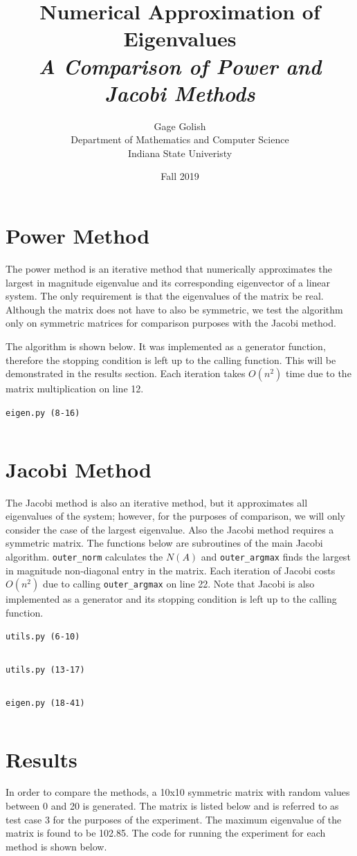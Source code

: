 \documentclass[12pt]{article}
\title{
  \textbf{Numerical Approximation of Eigenvalues}\\
  \Large \textit{A Comparison of Power and Jacobi Methods}
}
\author{
  Gage Golish\\
  Department of Mathematics and Computer Science\\
  Indiana State Univeristy
}
\date{Fall 2019}
\newcommand{\snippetfromfile}[3]{
  \begin{mdframed}[
      backgroundcolor=black!10,
      linewidth=0pt
  ]
    \begin{center}
      \dotfill\texttt{#1 (#2-#3)}\dotfill
      \inputminted[firstline=#2, lastline=#3, linenos]{python}{#1}
    \end{center}
  \end{mdframed}
}
\begin{document}
\maketitle
\thispagestyle{empty}

\pagebreak

\tableofcontents

\pagebreak

\section{Power Method}
The power method is an iterative method that numerically approximates the
largest in magnitude eigenvalue and its corresponding eigenvector of a linear
system. The only requirement is that the eigenvalues of the matrix be real.
Although the matrix does not have to also be symmetric, we test the algorithm
only on symmetric matrices for comparison purposes with the Jacobi method.

The algorithm is shown below. It was implemented as a generator function,
therefore the stopping condition is left up to the calling function. This will
be demonstrated in the results section. Each iteration takes $O(n^2)$ time due
to the matrix multiplication on line 12.
\snippetfromfile{eigen.py}{8}{16}

\section{Jacobi Method}
The Jacobi method is also an iterative method, but it approximates all
eigenvalues of the system; however, for the purposes of comparison, we will
only consider the case of the largest eigenvalue. Also the Jacobi method
requires a symmetric matrix. The functions below are subroutines of the main
Jacobi algorithm. \texttt{outer\_norm} calculates the $N(A)$ and
\texttt{outer\_argmax} finds the largest in magnitude non-diagonal entry in the
matrix. Each iteration of Jacobi costs $O(n^2)$ due to calling
\texttt{outer\_argmax} on line 22. Note that Jacobi is also implemented as a
generator and its stopping condition is left up to the calling function.
\snippetfromfile{utils.py}{6}{10}
\snippetfromfile{utils.py}{13}{17}
\snippetfromfile{eigen.py}{18}{41}

\section{Results}
In order to compare the methods, a 10x10 symmetric matrix with random values
between 0 and 20 is generated. The matrix is listed below and is referred to as
test case 3 for the purposes of the experiment. The maximum eigenvalue of the
matrix is found to be 102.85. The code for running the experiment for each
method is shown below.
\end{document}
